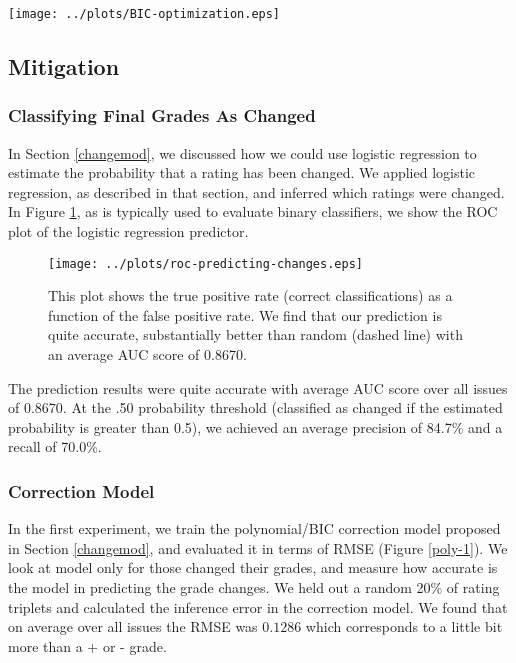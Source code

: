 \begin{figure*}[ht!]
\hspace{-7em}
    \texttt{[image: ../plots/BIC-optimization.eps]}
      \caption{We plot the difference between ratings and the median (X-axis), and the change in rating (Y-axis). We overlay the optimal polynomial model to represent the relationship $f(x) = y$. Below each plot, is the BIC objective function showing how we picked an optimal degree of polynomial.}
      \label{opt-1}
\end{figure*}

\subsection{Mitigation}

\subsubsection{Classifying Final Grades As Changed}
In Section \ref{changemod}, we discussed how we could use logistic regression to estimate the probability that a rating has been changed.
We applied logistic regression, as described in that section, and inferred which ratings were changed.
In Figure \ref{change-pred-1}, as is typically used to evaluate binary classifiers, we show the ROC plot of the logistic regression predictor.
\begin{figure}[h]
\centering
    \texttt{[image: ../plots/roc-predicting-changes.eps]}
      \caption{This plot shows the true positive rate (correct classifications) as a function of the false positive rate. We find that our prediction is quite accurate, substantially better than random (dashed line) with an average AUC score of 0.8670.}
      \label{change-pred-1}
\end{figure}
The prediction results were quite accurate with average AUC score over all issues of 0.8670.
At the .50 probability threshold (classified as changed if the estimated probability is greater than 0.5), we achieved an average precision of 84.7\% and a recall of 70.0\%.

\subsubsection{Correction Model}
In the first experiment, we train the polynomial/BIC correction model proposed in Section \ref{changemod}, and evaluated it in terms of RMSE (Figure \ref{poly-1}).
We look at model only for those changed their grades, and measure how accurate is the model in predicting the grade changes.
We held out a random 20\% of rating triplets and calculated the inference error in the correction model.
We found that on average over all issues the RMSE was $0.1286$ which corresponds to a little bit more than a + or - grade.

